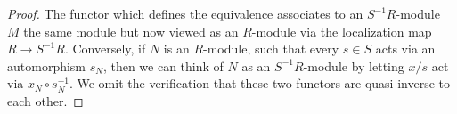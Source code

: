 \documentclass[10pt,a4paper]{amsart}
\theoremstyle{plain}
\theoremstyle{definition}
\theoremstyle{remark}
\numberwithin{equation}{subsection}
\begin{document}
\begin{proof}
The functor which defines the equivalence associates to an $S^{-1}R$-module
$M$ the same module but now viewed as an $R$-module via the localization
map $R \to S^{-1}R$. Conversely, if $N$ is an $R$-module, such that every
$s \in S$ acts via an automorphism $s_N$, then we can think of $N$ as an
$S^{-1}R$-module by letting $x/s$ act via $x_N  \circ s_N^{-1}$.
We omit the verification that these two functors are quasi-inverse to
each other.
\end{proof}
\end{document}
